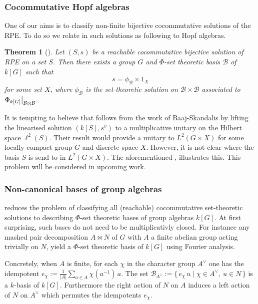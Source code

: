 \documentclass[a4paper,10pt]{amsart}
\newtheorem{maintheorem}{Theorem}
\theoremstyle{definition}
\theoremstyle{remark}
\newcommand\ot{\otimes}
\newcommand\mc{\mathcal}
\newcommand\restr[2]{{%
   \left.\kern-\nulldelimiterspace %
   #1 %
   \right|_{#2} %
   }}
\begin{document}
\subsubsection*{Cocommutative Hopf algebras} 

One of our aims is to classify non-finite bijective cocommutative solutions of the RPE. To do so we relate in   such solutions  as following to Hopf algebras.

\begin{maintheorem}[]\label{main th cocomm}
Let $(S,s)$ be a reachable cocommutative bijective solution of RPE on a set $S$. Then there exists a group $G$ and $\Phi$-set theoretic basis $\mc{B}$ of $k[G]$ such that 
$$ s = \phi_{\mc{B}} \times 1_{X}$$ 
for some set $X$, where $\phi_{\mc{B}}$ is the set-theoretic solution on $\mc{B} \times \mc{B}$ associated to $\restr{\Phi_{k[G]}}{\mc{B} \ot \mc{B}}$.
\end{maintheorem}

It is tempting to believe that  follows from the work of Baaj-Skandalis \cite{BaSk93, BaSk03} by lifting the linearised solution $(k[S],s^v)$ to a multiplicative unitary on the Hilbert space $\ell^2(S)$. Their result would provide a unitary to $L^2(G \times X)$ for some locally compact group $G$ and discrete space $X$. However, it is not clear where the basis $S$ is send to in $L^2(G \times X)$. The aforementioned , illustrates this. This problem will be considered in upcoming work.

\subsubsection*{Non-canonical bases of group algebras}

 reduces the problem of classifying all (reachable) cocommutative set-theoretic solutions to describing $\Phi$-set theoretic bases of group algebras $k[G]$. At first surprising, such bases do not need to be multiplicativly closed. For instance any mashed pair decomposition $A \bowtie N$ of $G$ with $A$ a finite abelian group acting trivially on $N$, yield a $\Phi$-set theoretic basis of $k[G]$ using Fourier analysis. 

Concretely, when $A$ is finite, for each $\chi$ in the character group $A^{\vee}$ one has the idempotent $e_{\chi} := \frac{1}{|A|}\sum_{a\in A}\chi(a^{-1})\,a .$ The set  $\mathcal{B}_{A^\vee} := \{\, e_\chi\,u \mid \chi\in A^\vee,\ u\in N\,\}$  is a $k$-basis of $k[G]$. Furthermore the right action of $N$ on $A$ induces a left action of $N$ on $A^\vee$ which permutes the idempotents $e_{\chi}$.
\end{document}
